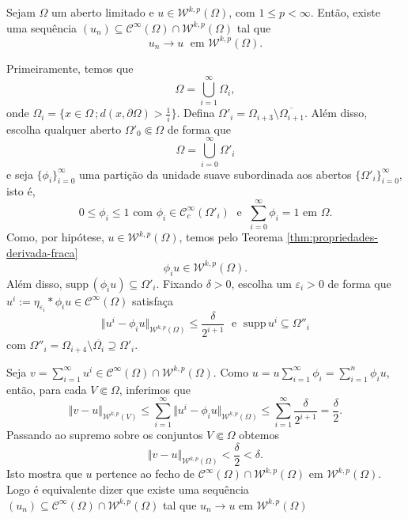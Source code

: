 \documentclass[a4paper, 11pt]{book}
\theoremstyle{definition}
\newcommand{\cC}{\mathcal{C}}
\newcommand{\cW}{\mathcal{W}}
\newcommand{\supp}{\mathrm{supp}\,}
\begin{document}
\begin{tbox}
    Sejam $\Omega$ um aberto limitado e $u \in \cW^{k,p}(\Omega)$, com $1 \leqslant p < \infty$.
    Então, existe uma sequência $(u_n) \subseteq \cC^{\infty}(\Omega) \cap \cW^{k,p}(\Omega)$ tal que
    \[
        u_n \to u \;\text{ em } \cW^{k,p}(\Omega).
    \] 
\end{tbox}
\begin{prf}
    Primeiramente, temos que
    \[
        \Omega = \bigcup_{i=1}^\infty \Omega_i,
    \]
    onde $\Omega_i = \{x \in \Omega \,; d(x, \partial\Omega) > \tfrac{1}{i}\}$. Defina $\Omega'_i = \Omega_{i+3} \setminus \overline{\Omega_{i+1}}$.
    Além disso, escolha qualquer aberto $\Omega'_0 \Subset \Omega$ de forma que
    \[
        \Omega = \bigcup_{i=0}^\infty \Omega'_i
    \]
    e seja $\{\phi_i\}_{i=0}^\infty$ uma partição da unidade suave subordinada aos abertos $\{\Omega'_i\}_{i=0}^\infty$, isto é,
    \[
       0 \leqslant \phi_i \leqslant 1 \text{ com } \phi_i \in \cC^\infty_c(\Omega'_i) \;\text{ e }\; \sum_{i=0}^\infty \phi_i = 1 \text{ em } \Omega.
    \]
    Como, por hipótese, $u \in \cW^{k,p}(\Omega)$, temos pelo Teorema \ref{thm:propriedades-derivada-fraca}
    \[
        \phi_i u \in \cW^{k,p}(\Omega).
    \]
    Além disso, $\supp(\phi_i u) \subseteq \Omega'_i$.
    Fixando $\delta > 0$, escolha um $\varepsilon_i > 0$ de forma que $u^i := \eta_{\varepsilon_i} * \phi_i u \in \cC^{\infty}(\Omega)$ satisfaça
    \[
        \Vert u^i - \phi_i u \Vert_{\cW^{k,p}(\Omega)} \leqslant \frac{\delta}{2^{i+1}} \;\text{ e }\; \supp u^i \subseteq \Omega''_i
    \]
    com $\Omega''_i = \Omega_{i+4} \setminus \overline{\Omega_{i}} \supseteq \Omega'_i$.

    Seja $v = \sum_{i=1}^\infty u^i \in \cC^{\infty}(\Omega) \cap \cW^{k,p}(\Omega)$.
    Como $u = u \sum_{i=1}^\infty \phi_i = \sum_{i=1}^n \phi_i u$, então, para cada $V \Subset \Omega$, inferimos que
    \[
        \Vert v - u \Vert_{\cW^{k,p}(V)} \leqslant \sum_{i=1}^\infty \Vert u^i - \phi_i u \Vert_{\cW^{k,p}(\Omega)} \leqslant \sum_{i=1}^\infty \frac{\delta}{2^{i+1}} = \frac{\delta}{2}.
    \]
    Passando ao supremo sobre os conjuntos $V \Subset \Omega$ obtemos
    \[
        \Vert v - u \Vert_{\cW^{k,p}(\Omega)} < \frac{\delta}{2} < \delta.
    \]
    Isto mostra que $u$ pertence ao fecho de $\cC^\infty(\Omega) \cap \cW^{k,p}(\Omega)$ em $\cW^{k,p}(\Omega)$. Logo é equivalente dizer que existe uma sequência $(u_n) \subseteq \cC^\infty(\Omega) \cap \cW^{k,p}(\Omega)$ tal que $u_n \to u$ em $\cW^{k,p}(\Omega)$
\end{prf}
\end{document}
